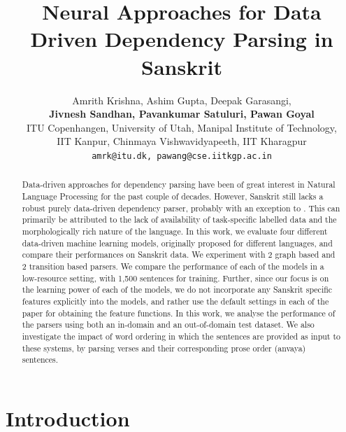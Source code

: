 \documentclass[11pt]{article}
\title{Neural Approaches for Data Driven Dependency Parsing in Sanskrit}
\author{Amrith Krishna, Ashim Gupta,  Deepak Garasangi,  \\\textbf{Jivnesh Sandhan, Pavankumar Satuluri, Pawan Goyal} \\
ITU Copenhangen, University of Utah, Manipal Institute of Technology, \\IIT Kanpur, Chinmaya Vishwavidyapeeth, IIT Kharagpur \\
  {\tt amrk@itu.dk, pawang@cse.iitkgp.ac.in} 
\\}
\date{}
\begin{document}
\maketitle
\linenumbers
\begin{abstract}
Data-driven approaches for dependency parsing have been of great interest in Natural Language Processing for the past couple of decades. However, Sanskrit still lacks a robust purely data-driven dependency parser, probably with an exception to . This can primarily be attributed to the lack of availability of task-specific labelled data  and the morphologically rich nature of the language. In this work, we evaluate four different data-driven machine learning models, originally proposed for different languages, and compare their performances on Sanskrit data. We experiment with 2 graph based and 2 transition based parsers. We compare the performance of each of the models in a low-resource setting, with 1,500 sentences for training. Further, since our focus is on the learning power of each of the models, we do not incorporate any Sanskrit specific features explicitly into the models, and rather use the default settings in each of the paper for obtaining the feature functions. In this work, we analyse the performance of the parsers using both an in-domain and an out-of-domain test dataset. We also investigate the impact of word ordering in which the sentences are provided as  input to these systems, by parsing verses and their corresponding prose order (anvaya) sentences. 




\end{abstract}

\section{Introduction}
\label{intro}
\end{document}
